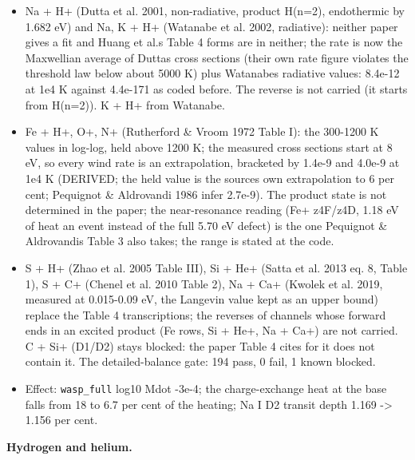 \documentclass[english,a4paper]{my_memo}
\providecommand{\tightlist}{\setlength{\itemsep}{0pt}\setlength{\parskip}{0pt}}
\begin{document}
\begin{itemize}
\tightlist
\item
  Na + H+ (Dutta et al. 2001, non-radiative, product H(n=2), endothermic by
  1.682 eV) and Na, K + H+ (Watanabe et al. 2002, radiative): neither paper
  gives a fit and Huang et al.\textquotesingle s Table 4 forms are in neither; the rate is
  now the Maxwellian average of Dutta\textquotesingle s cross sections (their own rate
  figure violates the threshold law below about 5000 K) plus Watanabe\textquotesingle s
  radiative values: 8.4e-12 at 1e4 K against 4.4e-171 as coded before. The
  reverse is not carried (it starts from H(n=2)). K + H+ from Watanabe.
\item
  Fe + H+, O+, N+ (Rutherford \& Vroom 1972 Table I): the 300-1200 K values
  in log-log, held above 1200 K; the measured cross sections start at 8 eV,
  so every wind rate is an extrapolation, bracketed by 1.4e-9 and 4.0e-9 at
  1e4 K (DERIVED; the held value is the source\textquotesingle s own extrapolation to 6 per
  cent; Pequignot \& Aldrovandi 1986 infer 2.7e-9). The product state is not
  determined in the paper; the near-resonance reading (Fe+ z4F/z4D, 1.18 eV
  of heat an event instead of the full 5.70 eV defect) is the one Pequignot
  \& Aldrovandi\textquotesingle s Table 3 also takes; the range is stated at the code.
\item
  S + H+ (Zhao et al. 2005 Table III), Si + He+ (Satta et al. 2013 eq. 8,
  Table 1), S + C+ (Chenel et al. 2010 Table 2), Na + Ca+ (Kwolek et al.
  2019, measured at 0.015-0.09 eV, the Langevin value kept as an upper bound)
  replace the Table 4 transcriptions; the reverses of channels whose forward
  ends in an excited product (Fe rows, Si + He+, Na + Ca+) are not carried.
  C + Si+ (D1/D2) stays blocked: the paper Table 4 cites for it does not
  contain it. The detailed-balance gate: 194 pass, 0 fail, 1 known blocked.
\item
  Effect: \texttt{wasp\_full} log10 Mdot -3e-4; the charge-exchange heat at the base
  falls from 18 to 6.7 per cent of the heating; Na I D2 transit depth 1.169
  -\textgreater{} 1.156 per cent.
\end{itemize}

\textbf{Hydrogen and helium.}
\end{document}
